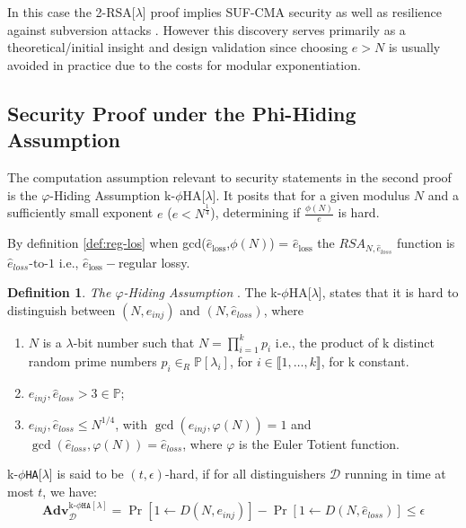 \documentclass[]{final_report}
\theoremstyle{definition}
\newtheorem{definition}{Definition}[chapter]
\begin{document}
In this case the 2-RSA[\(\lambda\)] proof implies SUF-CMA security as well as resilience against subversion attacks \cite{ateniese2015subversion}. However this discovery serves primarily as a theoretical/initial insight and design validation since choosing \( e > N \) is usually avoided in practice due to the costs for modular exponentiation. 

\subsection{Security Proof under the Phi-Hiding Assumption}
The computation assumption relevant to security statements in the second proof is the $\varphi$-Hiding Assumption k-$\phi$HA[$\lambda$]. 
It posits that for a given modulus \( N \) and a sufficiently small exponent \( e \) (\( e < N^{\frac{1}{4}} \)), determining if \(\frac{\phi(N)}{e}\) is hard. 

By definition \ref{def:reg-los} when gcd(\( \hat{e}_{\text{loss}} \),\( \phi(N) \)) = \( \hat{e}_{\text{loss}} \) the $RSA_{N, \hat{e}_{loss}}$ function is \( \hat{e}_{loss}{\text{-to-}}1 \) i.e., \( \hat{e}_{\text{loss}}- \)regular lossy.

\begin{definition}
\textit{The $\varphi$-Hiding Assumption} \cite{10.1007/3-540-48910-X_28}. The k-$\phi$HA[$\lambda$], states that it is hard to distinguish between $(N,e_{inj})$ and $(N,\hat{e}_{loss})$, where 
\begin{enumerate}
\item $N$ is a $\lambda$-bit number such that $N = \displaystyle\prod_{i=1}^{k} p_i$ i.e., the product of k distinct random prime numbers $p_i \in_{R} \mathbb{P}[\lambda_i]$, for $i \in \llbracket1, \ldots, k \rrbracket$, for k constant.  
\item $e_{inj}, \hat{e}_{loss} > 3 \in \mathbb{P}$;
\item $e_{inj}, \hat{e}_{loss} \leq N^{1/4}$, with $\gcd(e_{inj}, \varphi(N)) = 1$ and $\gcd(\hat{e}_{loss}, \varphi(N)) = \hat{e}_{loss}$, where $\varphi$ is the Euler Totient function. 
\end{enumerate}
k-$\phi$\texttt{HA}[$\lambda$] is said to be $(t, \epsilon)$-hard, if for all distinguishers $\mathcal{D}$ running in time at most $t$, we have:
\[
\textbf{Adv}^{\text{k-}\phi \texttt{HA}[\lambda]}_\mathcal{D} = \Pr[1 \leftarrow D(N, e_{inj})] - \Pr[1 \leftarrow D(N,\hat{e}_{loss})] \leqslant \epsilon
\]
\end{definition}
\end{document}
